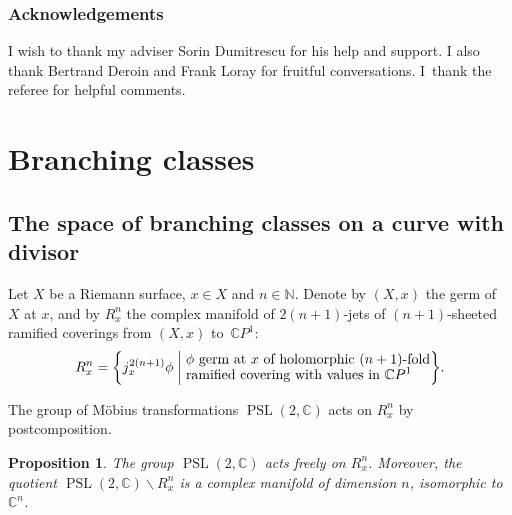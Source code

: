 \documentclass[10pt]{amsart}
\newcommand{\C}{\mathbb C}
\newcommand{\N}{\mathbb N}
\newcommand{\CP}{\mathbb CP}
\DeclareMathOperator{\PSL}{PSL}
\theoremstyle{definition}
\theoremstyle{plain}
\newtheorem{proposition}[definition]{Proposition}
\begin{document}
\subsubsection*{Acknowledgements}
I wish to thank my adviser Sorin Dumitrescu for his help and support.
I also thank Bertrand Deroin and Frank Loray for fruitful conversations.
I~thank the referee for helpful comments.

\section{Branching classes}\label{section_branching_classes}

\subsection{The space of branching classes on a curve with divisor}

Let $X$ be a Riemann surface, $x \in X$ and $n \in \N$.
Denote by $(X, x)$ the germ of $X$ at $x$, and by $R_x^n$ the complex manifold of $2(n+1)$-jets of $(n+1)$-sheeted ramified coverings from $(X, x)$ to~$\CP^1$:
\begin{equation}\label{eq_space_jets_coverings}
R_x^n = \biggl\{j^{2(n+1)}_x \phi \biggm|
\begin{aligned}
&\text{$\phi$ germ at $x$ of holomorphic $(n+1)$-fold} \\[-5pt]
&\text{ramified covering with values in $\CP^1$}
\end{aligned}
\biggr\}.
\end{equation}

The group of Möbius transformations $\PSL(2, \C)$ acts on $R_x^n$ by postcomposition.

\begin{proposition}
The group $\PSL(2, \C)$ acts freely on $R_x^n$.
Moreover, the quotient $\PSL(2, \C) \backslash R_x^n$ is a complex manifold of dimension $n$, isomorphic to $\C^n$.
\end{proposition}
\end{document}
